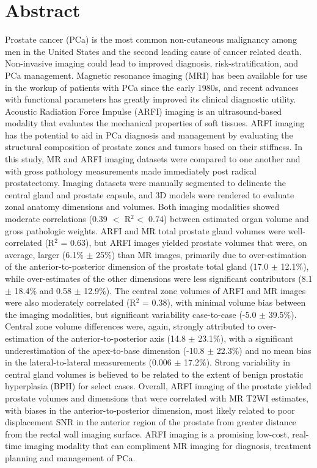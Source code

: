 \section*{Abstract}
Prostate cancer (PCa) is the most common non-cutaneous malignancy among men in
the United States and the second leading cause of cancer related death.
Non-invasive imaging could lead to improved diagnosis, risk-stratification, and
PCa management.  Magnetic resonance imaging (MRI) has been available for use in
the workup of patients with PCa since the early 1980s, and recent advances with
functional parameters has greatly improved its clinical diagnostic utility.
Acoustic Radiation Force Impulse (ARFI) imaging is an ultrasound-based modality
that evaluates the mechanical properties of soft tissues. ARFI imaging has the
potential to aid in PCa diagnosis and management by evaluating the structural
composition of prostate zones and tumors based on their stiffness.  In this
study, MR and ARFI imaging datasets were compared to one another and with gross
pathology measurements made immediately post radical prostatectomy.  Imaging
datasets were manually segmented to delineate the central gland and prostate
capsule, and 3D models were rendered to evaluate zonal anatomy dimensions and
volumes.  Both imaging modalities showed moderate correlations (0.39 $<$ R$^2 <
$ 0.74) between estimated organ volume and gross pathologic weights.  ARFI and MR
total prostate gland volumes were well-correlated (R$^2$ = 0.63), but ARFI
images yielded prostate volumes that were, on average, larger (6.1\% $\pm$ 25\%)
than MR images, primarily due to over-estimation of the anterior-to-posterior
dimension of the prostate total gland (17.0 $\pm$ 12.1\%), while over-estimates
of the other dimensions were less significant contributors (8.1 $\pm$ 18.4\%
and 0.58 $\pm$ 12.9\%).  The central zone volumes of ARFI and MR images were
also moderately correlated (R$^2$ = 0.38), with minimal volume bias between the
imaging modalities, but significant variability case-to-case (-5.0 $\pm$
39.5\%).  Central zone volume differences were, again, strongly attributed to
over-estimation of the anterior-to-posterior axis (14.8 $\pm$ 23.1\%), with a
significant underestimation of the apex-to-base dimension (-10.8 $\pm$ 22.3\%)
and no mean bias in the lateral-to-lateral measurements (0.006 $\pm$ 17.2\%).
Strong variability in central gland volumes is believed to be related to the
extent of benign prostatic hyperplasia (BPH) for select cases.  Overall, ARFI
imaging of the prostate yielded prostate volumes and dimensions that were
correlated with MR T2WI estimates, with biases in the anterior-to-posterior
dimension, most likely related to poor displacement SNR in the anterior region
of the prostate from greater distance from the rectal wall imaging surface.
ARFI imaging is a promising low-cost, real-time imaging modality that can
compliment MR imaging for diagnosis, treatment planning and management of PCa.
